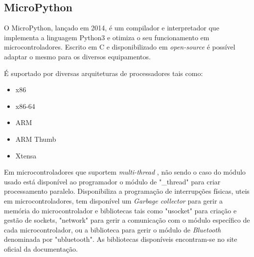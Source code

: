\subsection {MicroPython}
\par O MicroPython\cite{MicroPython}, lançado em 2014, é um compilador e interpretador que implementa a linguagem Python3 e otimiza o seu funcionamento em microcontroladores. Escrito em C e disponibilizado em \textit{open-source} é possível adaptar o mesmo para os diversos equipamentos. \par
É suportado por diversas arquiteturas de processadores tais como:
\par
\begin{itemize}
\item x86
\item x86-64
\item ARM
\item ARM Thumb
\item Xtensa
\end{itemize}
\par
Em microcontroladores que suportem \textit{multi-thread} , não sendo o caso do módulo usado está disponível ao programador o módulo de "\_thread" para criar processamento paralelo. Disponibiliza a programação de interrupções físicas, uteis em microcontroladores, tem disponível um \textit{Garbage collector} para gerir a memória do microcontrolador e bibliotecas tais como "usocket" para criação e gestão de sockets, "network" para gerir a comunicação com o módulo específico de cada microcontrolador, ou a biblioteca para gerir o módulo de \textit{Bluetooth} denominada por "ubluetooth". As bibliotecas disponíveis encontram-se no site oficial da documentação\cite{micropython_lib}. 

